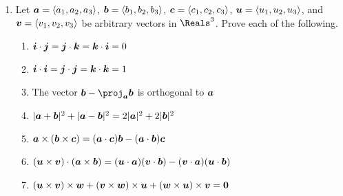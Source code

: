 \documentclass[12 pt]{article}
\begin{document}
\begin{enumerate}[leftmargin=0in, rightmargin=-0.25in]
%		
	\item Let $\boldsymbol{a}=\langle a_1,a_2,a_3\rangle$, $\boldsymbol{b}=\langle b_1,b_2,b_3\rangle$, $\boldsymbol{c}=\langle c_1,c_2,c_3\rangle$, $\boldsymbol{u}=\langle u_1,u_2,u_3\rangle$, and $\boldsymbol{v}=\langle v_1,v_2,v_3\rangle$ be arbitrary vectors in $\Reals^3$. Prove each of the following.
	\begin{enumerate}[itemsep=0.95in]
		\item $\boldsymbol{i}\cdot\boldsymbol{j}=\boldsymbol{j}\cdot\boldsymbol{k}=\boldsymbol{k}\cdot\boldsymbol{i}=0$
		\item $\boldsymbol{i}\cdot\boldsymbol{i}=\boldsymbol{j}\cdot\boldsymbol{j}=\boldsymbol{k}\cdot\boldsymbol{k}=1$
		\item The vector $\vect{b}-\proj_{\vect{a}}\vect{b}$ is orthogonal to $\boldsymbol{a}$
		\item $|\boldsymbol{a}+\boldsymbol{b}|^2+|\boldsymbol{a}-\boldsymbol{b}|^2=2|\boldsymbol{a}|^2+2|\boldsymbol{b}|^2$
		\item $\boldsymbol{a}\times(\boldsymbol{b}\times\boldsymbol{c})=(\boldsymbol{a}\cdot\boldsymbol{c})\boldsymbol{b}-(\boldsymbol{a}\cdot\boldsymbol{b})\boldsymbol{c}$
		\item $(\boldsymbol{u}\times\boldsymbol{v})\cdot(\boldsymbol{a}\times\boldsymbol{b})=(\boldsymbol{u}\cdot\boldsymbol{a})(\boldsymbol{v}\cdot\boldsymbol{b})-(\boldsymbol{v}\cdot\boldsymbol{a})(\boldsymbol{u}\cdot\boldsymbol{b})$
		\item $(\boldsymbol{u}\times\boldsymbol{v})\times\boldsymbol{w}+(\boldsymbol{v}\times\boldsymbol{w})\times\boldsymbol{u}+(\boldsymbol{w}\times\boldsymbol{u})\times\boldsymbol{v}=\boldsymbol{0}$
	\end{enumerate}
	
	\newpage
	

\end{enumerate}
\end{document}

